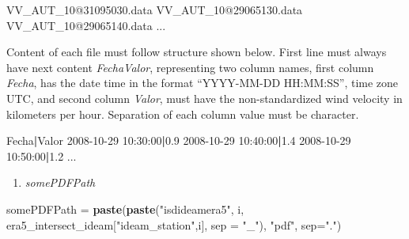 \documentclass[12pt,oneside]{reedthesis}
\newenvironment{Shaded}{\begin{snugshade}}{\end{snugshade}}
\newcommand{\DataTypeTok}[1]{\textcolor[rgb]{0.13,0.29,0.53}{#1}}
\newcommand{\ExtensionTok}[1]{#1}
\newcommand{\KeywordTok}[1]{\textcolor[rgb]{0.13,0.29,0.53}{\textbf{#1}}}
\newcommand{\NormalTok}[1]{#1}
\newcommand{\StringTok}[1]{\textcolor[rgb]{0.31,0.60,0.02}{#1}}
\providecommand{\tightlist}{%
  \setlength{\itemsep}{0pt}\setlength{\parskip}{0pt}}
\begin{document}
\scriptsize

\vspace{0.4cm}
\begin{Shaded}
\begin{Highlighting}[]
      \ExtensionTok{VV_AUT_10@31095030.data}
      \ExtensionTok{VV_AUT_10@29065130.data}
      \ExtensionTok{VV_AUT_10@29065140.data}
      \ExtensionTok{...}
\end{Highlighting}
\end{Shaded}
\normalsize

Content of each file must follow structure shown below. First line must always have next content \emph{Fecha\textbar Valor}, representing two column names, first column \emph{Fecha}, has the date time in the format ``YYYY-MM-DD HH:MM:SS'', time zone UTC, and second column \emph{Valor}, must have the non-standardized wind velocity in kilometers per hour. Separation of each column value must be \emph{\textbar{}} character.

\scriptsize

\vspace{0.4cm}
\begin{Shaded}
\begin{Highlighting}[]
      \ExtensionTok{Fecha}\KeywordTok{|}\ExtensionTok{Valor}
      \ExtensionTok{2008-10-29}\NormalTok{ 10:30:00}\KeywordTok{|}\ExtensionTok{0.9}
      \ExtensionTok{2008-10-29}\NormalTok{ 10:40:00}\KeywordTok{|}\ExtensionTok{1.4}
      \ExtensionTok{2008-10-29}\NormalTok{ 10:50:00}\KeywordTok{|}\ExtensionTok{1.2}
      \ExtensionTok{...}
\end{Highlighting}
\end{Shaded}
\normalsize
\begin{enumerate}
\def\labelenumi{\arabic{enumi}.}
\setcounter{enumi}{5}
\tightlist
\item
  \emph{somePDFPath}
\end{enumerate}
\scriptsize

\vspace{0.4cm}
\begin{Shaded}
\begin{Highlighting}[]
\NormalTok{      somePDFPath =}\StringTok{ }\KeywordTok{paste}\NormalTok{(}\KeywordTok{paste}\NormalTok{(}\StringTok{"isdideamera5"}\NormalTok{, i, era5_intersect_ideam[}\StringTok{"ideam_station"}\NormalTok{,i], }\DataTypeTok{sep =} \StringTok{"_"}\NormalTok{), }
                          \StringTok{"pdf"}\NormalTok{, }\DataTypeTok{sep=}\StringTok{"."}\NormalTok{)}
\end{Highlighting}
\end{Shaded}
\normalsize
\end{document}
